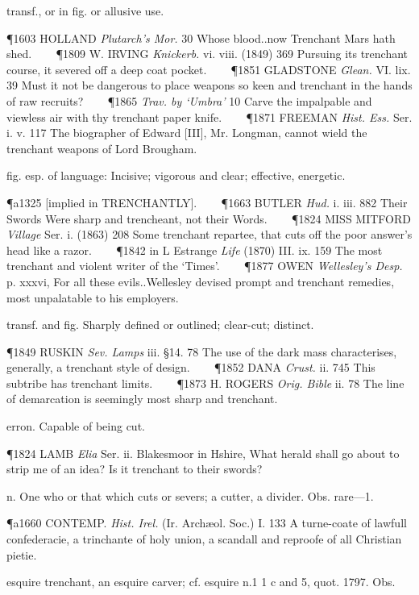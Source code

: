 \begin{description}[wide, labelwidth=!, labelindent=0pt]
\begin{myenumerate}
 transf., or in fig. or allusive use.

\P 1603 HOLLAND  \textit{Plutarch's Mor.} 30 Whose blood..now Trenchant Mars hath shed.    
\P 1809 W. IRVING  \textit{Knickerb.} vi. viii. (1849) 369 Pursuing its trenchant course, it severed off a deep coat pocket.    
\P 1851 GLADSTONE  \textit{Glean.} VI. lix. 39 Must it not be dangerous to place weapons so keen and trenchant in the hands of raw recruits?    
\P 1865 \textit{Trav.  by ‘Umbra’} 10 Carve the impalpable and viewless air with thy trenchant paper knife.    
\P 1871 FREEMAN  \textit{Hist. Ess.} Ser. i. v. 117 The biographer of Edward [III], Mr. Longman, cannot wield the trenchant weapons of Lord Brougham.

 fig. esp. of language: Incisive; vigorous and clear; effective, energetic.

\P a1325 [implied in  TRENCHANTLY].    
\P 1663 BUTLER  \textit{Hud.} i. iii. 882 Their Swords Were sharp and trencheant, not their Words.    
\P 1824 MISS MITFORD  \textit{Village} Ser. i. (1863) 208 Some trenchant repartee, that cuts off the poor answer's head like a razor.    
\P 1842  in L Estrange \textit{Life} (1870) III. ix. 159 The most trenchant and violent writer of the ‘Times’.    
\P 1877 OWEN  \textit{Wellesley's Desp.} p. xxxvi, For all these evils..Wellesley devised prompt and trenchant remedies, most unpalatable to his employers.

 transf. and fig. Sharply defined or outlined; clear-cut; distinct.

\P 1849 RUSKIN  \textit{Sev. Lamps} iii. §14. 78 The use of the dark mass characterises, generally, a trenchant style of design.    
\P 1852 DANA  \textit{Crust.} ii. 745 This subtribe has trenchant limits.    
\P 1873 H. ROGERS  \textit{Orig. Bible} ii. 78 The line of demarcation is seemingly most sharp and trenchant.

 erron. Capable of being cut.

\P 1824 LAMB  \textit{Elia} Ser. ii. Blakesmoor in Hshire, What herald shall go about to strip me of an idea? Is it trenchant to their swords?

 n. One who or that which cuts or severs; a cutter, a divider. Obs. rare—1.

\P a1660 CONTEMP.  \textit{Hist. Irel.} (Ir. Archæol. Soc.) I. 133 A turne-coate of lawfull confederacie, a trinchante of holy union, a scandall and reproofe of all Christian pietie.

 esquire trenchant, an esquire carver; cf. esquire n.1 1 c and 5, quot. 1797. Obs.


\end{myenumerate}
\end{description}
